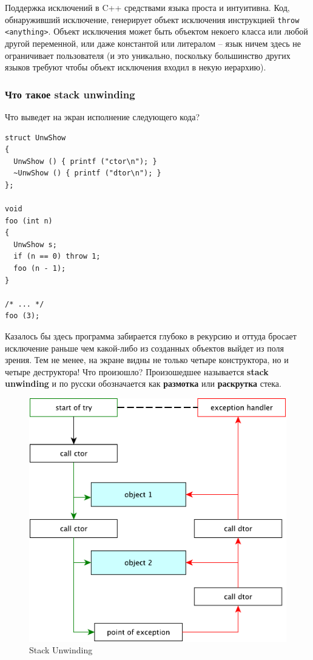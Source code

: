 \documentclass[a4paper,12pt,oneside]{article}
\begin{document}
Поддержка исключений в C++ средствами языка проста и интуитивна. Код, обнаруживший исключение, генерирует объект исключения инструкцией \lstinline!throw <anything>!. Объект исключения может быть объектом некоего класса или любой другой переменной, или даже константой или литералом -- язык ничем здесь не ограничивает пользователя (и это уникально, поскольку большинство других языков требуют чтобы объект исключения входил в некую иерархию). 

\subsubsection{Что такое stack unwinding}\label{StackUnwinding}

Что выведет на экран исполнение следующего кода?

\begin{lstlisting}
struct UnwShow
{
  UnwShow () { printf ("ctor\n"); }
  ~UnwShow () { printf ("dtor\n"); }
};

void
foo (int n)
{
  UnwShow s;
  if (n == 0) throw 1;
  foo (n - 1);
}

/* ... */
foo (3);

\end{lstlisting}

Казалось бы здесь программа забирается глубоко в рекурсию и оттуда бросает исключение раньше чем какой-либо из созданных объектов выйдет из поля зрения. Тем не менее, на экране видны не только четыре конструктора, но и четыре деструктора! Что произошло? Произошедшее называется \textbf{stack unwinding} и по русски обозначается как \textbf{размотка} или \textbf{раскрутка} стека.

\begin{figure}[h!]
\centering
\includegraphics[width=1.0\textwidth]{illustrations/stack-unwind-crop.pdf}
\caption{Stack Unwinding}
\label{fig:stack_unwind}
\end{figure}
\end{document}
